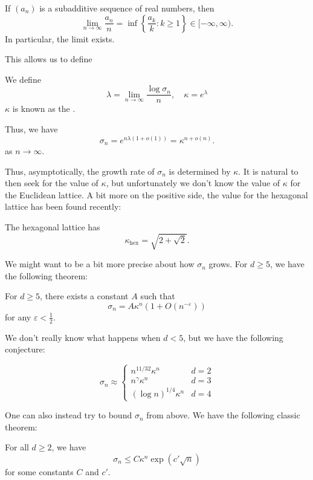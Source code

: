 \documentclass[a4paper]{article}
\begin{document}
\begin{lemma}
  If $(a_n)$ is a subadditive sequence of real numbers, then
  \[
    \lim_{n \to \infty} \frac{a_n}{n} = \inf\left\{\frac{a_k}{k}: k \geq 1\right\} \in [-\infty, \infty).
  \]
  In particular, the limit exists.
\end{lemma}

This allows us to define
\begin{defi}\index{$\lambda$}\index{$\kappa$}
  We define
  \[
    \lambda = \lim_{n \to \infty} \frac{\log \sigma_n}{n},\quad \kappa = e^\lambda
  \]
  $\kappa$ is known as the .
\end{defi}

Thus, we have
\[
  \sigma_n= e^{n \lambda (1 + o(1))} = \kappa^{n + o(n)}.
\]
as $n \to \infty$.

Thus, asymptotically, the growth rate of $\sigma_n$ is determined by $\kappa$. It is natural to then seek for the value of $\kappa$, but unfortunately we don't know the value of $\kappa$ for the Euclidean lattice. A bit more on the positive side, the value for the hexagonal lattice has been found recently:
\begin{thm}
  The hexagonal lattice has
  \[
    \kappa_{\mathrm{hex}} = \sqrt{2 + \sqrt{2}}.
  \]
\end{thm}

We might want to be a bit more precise about how $\sigma_n$ grows. For $d \geq 5$, we have the following theorem:
\begin{thm}
  For $d \geq 5$, there exists a constant $A$ such that
  \[
    \sigma_n = A \kappa^n (1 + O(n^{-\varepsilon}))
  \]
  for any $\varepsilon < \frac{1}{2}$.
\end{thm}

We don't really know what happens when $d < 5$, but we have the following conjecture:

\begin{conjecture}
  \[
    \sigma_n \approx
    \begin{cases}
      n^{11/32} \kappa^n & d = 2\\
      n^\gamma \kappa^n & d = 3\\
      (\log n)^{1/4} \kappa^n & d = 4
    \end{cases}
  \]
\end{conjecture}

One can also instead try to bound $\sigma_n$ from above. We have the following classic theorem:
\begin{thm}
  For all $d \geq 2$, we have
  \[
    \sigma_n \leq C \kappa^n \exp(c' \sqrt{n})
  \]
  for some constants $C$ and $c'$.
\end{thm}
\end{document}
